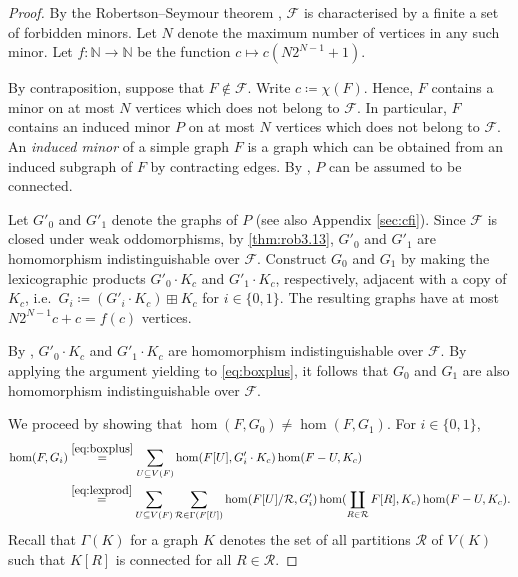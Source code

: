 \documentclass[11pt, DIV=15]{scrarticle}
\theoremstyle{definition}
\theoremstyle{plain}
\theoremstyle{remark}
\begin{document}
	\begin{proof}
		By the Robertson--Seymour theorem \cite{robertson_graph_2004},
		$\mathcal{F}$ is characterised by a finite a set of forbidden minors. 
		Let $N$ denote the maximum number of vertices in any such minor.
		Let $f \colon \mathbb{N} \to \mathbb{N}$ be the function $c \mapsto c (N2^{N-1} +1)$.
		
		By contraposition,
		suppose that $F \not\in \mathcal{F}$.
		Write $c \coloneqq \chi(F)$.
		Hence, $F$ contains a minor on at most $N$ vertices which does not belong to $\mathcal{F}$.
		In particular, $F$ contains an induced minor $P$ on at most $N$ vertices which does not belong to $\mathcal{F}$.
		An \emph{induced minor} of a simple graph $F$ is a graph which can be obtained from an induced subgraph of $F$ by contracting edges.
		By \cite[Lemma~4]{bulian_fixed-parameter_2017},
		$P$ can be assumed to be connected.
		
		
		Let $G'_0$ and $G'_1$ denote the  graphs of $P$ (see also Appendix \ref{sec:cfi}).
		Since $\mathcal{F}$ is closed under weak oddomorphisms, by \cref{thm:rob3.13},
		$G'_0$ and $G'_1$ are homomorphism indistinguishable over $\mathcal{F}$.
		Construct $G_0$ and $G_1$ by making the lexicographic products $G'_0 \cdot K_c$ and $G'_1 \cdot K_c$, respectively,
		adjacent with a copy of $K_c$, i.e.\ 
		$G_i \coloneqq (G'_i \cdot K_c) \boxplus K_c$ for $i \in \{0,1\}$.
		The resulting graphs have at most $N2^{N-1} c + c = f(c)$ vertices.
		
		By \cite[Theorem~14]{seppelt_logical_2024}, $G'_0 \cdot K_c$ and $G'_1 \cdot K_c$ are
		homomorphism indistinguishable over $\mathcal{F}$.
		By applying the argument yielding \cite[Theorem~14]{seppelt_logical_2024} to \cref{eq:boxplus}, 
		it follows that $G_0$ and $G_1$ are also homomorphism indistinguishable over $\mathcal{F}$.
		
		We proceed by showing that $\hom(F, G_0) \neq  \hom(F, G_1)$.
		For $i \in \{0,1\}$,
		\begin{align}
			\hom(F, G_i)
			&\overset{\eqref{eq:boxplus}}{=} \sum_{U \subseteq V(F)} \hom(F[U], G'_i \cdot K_c) \hom(F - U, K_c) \notag \\
			&\overset{\eqref{eq:lexprod}}{=} \sum_{U \subseteq V(F)} \sum_{\mathcal{R} \in \Gamma(F[U])} \hom(F[U]/\mathcal{R}, G'_i) \hom(\coprod_{R \in \mathcal{R}} F[R], K_c) \hom(F - U, K_c). \label{eq:lem-induced-minor}
		\end{align}
		Recall that $\Gamma(K)$ for a graph $K$ denotes the set of all partitions $\mathcal{R}$ of $V(K)$ such that $K[R]$ is connected for all $R \in \mathcal{R}$.
		

\end{proof}
\end{document}
